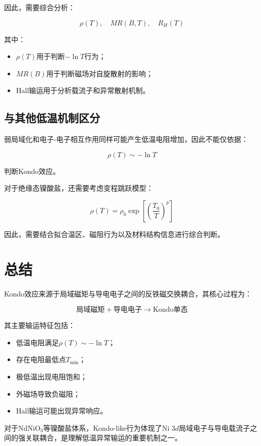 \documentclass[10.5pt]{article}
\begin{document}
因此，需要综合分析：

\begin{equation}
\rho(T),\quad MR(B,T),\quad R_H(T)
\end{equation}

其中：

\begin{itemize}
\item $\rho(T)$用于判断$-\ln T$行为；
\item $MR(B)$用于判断磁场对自旋散射的影响；
\item Hall输运用于分析载流子和异常散射机制。
\end{itemize}


\subsection{与其他低温机制区分}

弱局域化和电子-电子相互作用同样可能产生低温电阻增加，因此不能仅依据：

\begin{equation}
\rho(T)\sim-\ln T
\end{equation}

判断Kondo效应。

对于绝缘态镍酸盐，还需要考虑变程跳跃模型：

\begin{equation}
\rho(T)=
\rho_0
\exp
\left[
\left(
\frac{T_0}{T}
\right)^p
\right]
\end{equation}

因此，需要结合拟合温区、磁阻行为以及材料结构信息进行综合判断。


\section{总结}

Kondo效应来源于局域磁矩与导电电子之间的反铁磁交换耦合，其核心过程为：

\begin{equation}
\text{局域磁矩}
+
\text{导电电子}
\rightarrow
\text{Kondo单态}
\end{equation}

其主要输运特征包括：

\begin{itemize}
\item 低温电阻满足$\rho(T)\sim-\ln T$；
\item 存在电阻最低点$T_{\min}$；
\item 极低温出现电阻饱和；
\item 外磁场导致负磁阻；
\item Hall输运可能出现异常响应。
\end{itemize}

对于NdNiO$_3$等镍酸盐体系，Kondo-like行为体现了Ni $3d$局域电子与导电载流子之间的强关联耦合，是理解低温异常输运的重要机制之一。
\end{document}
